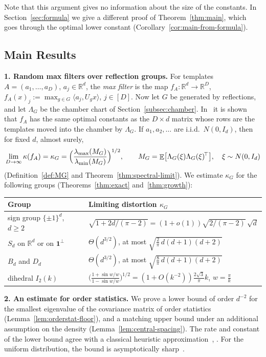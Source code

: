 \documentclass[11pt]{article}
\newcommand{\R}{\mathbb{R}}
\newcommand{\inner}[2]{\langle #1, #2 \rangle}
\theoremstyle{definition}
\DeclareMathOperator{\EX}{\mathbb{E}}
\begin{document}
	Note that this argument gives no information about the size of the constants. In
	Section~\ref{sec:formula} we give a different proof of Theorem~\ref{thm:main}, which
	goes through the optimal lower constant (Corollary~\ref{cor:main-from-formula}). 

	\subsection*{Main Results}

	\noindent\textbf{1. Random max filters over reflection groups.} For templates
	$A=(a_1,\dots,a_D)$, $a_j\in\R^d$, the \emph{max filter} \cite{cahill2025group} is the map $f_A\colon\R^d\to\R^D$,
	$f_A(x)_j:=\max_{g\in G}\inner{a_j}{U_gx}$, $j\in[D]$. Now let $G$ be generated by reflections, and let $\Lambda_G$ be the chamber chart of Section~\ref{subsec:chamber}. In~\cite[Lem.~9]{mixonpacker} it is shown that $f_A$ has the
	same optimal constants as the $D\times d$ matrix whose rows are the
	templates moved into the chamber by $\Lambda_G$. If $a_1,a_2,\dots$ are i.i.d.\
	$N(0,I_d)$, then for fixed $d$, almost surely,
	\[
	\lim_{D\to\infty}\kappa(f_A)=\kappa_G=\Bigl(\frac{\lambda_{\max}(M_G)}{\lambda_{\min}(M_G)}\Bigr)^{1/2},
	\qquad
	M_G=\EX\bigl[\Lambda_G(\xi)\Lambda_G(\xi)^{\!\top}\bigr],\quad \xi\sim N(0,I_d)
	\]
	(Definition~\ref{def:MG} and Theorem~\ref{thm:spectral-limit}). We  estimate $\kappa_G$ for the following groups
	(Theorems~\ref{thm:exact} and~\ref{thm:growth}):
	\begin{center}
		\renewcommand{\arraystretch}{1.3}
		\begin{tabular}{ll}
			\hline
			Group & Limiting distortion $\kappa_G$ \\
			\hline
			sign group $\{\pm1\}^d$, $d\ge2$ & $\sqrt{1+2d/(\pi-2)}=(1+o(1))\sqrt{2/(\pi-2)}\,\sqrt d$ \\
			$S_d$ on $\R^d$ or on $\mathbf 1^{\perp}$ & $\Theta(d^{3/2})$, at most $\sqrt{\tfrac2\pi\,d(d+1)(d+2)}$ \\
			$B_d$ and $D_d$ & $\Theta(d^{3/2})$, at most $\sqrt{\tfrac8\pi\,d(d+1)(d+2)}$ \\
			dihedral $I_2(k)$ & $\bigl(\tfrac{1+\sin w/w}{1-\sin w/w}\bigr)^{1/2}=(1+O(k^{-2}))\tfrac{2\sqrt3}{\pi}k$, $w=\tfrac\pi k$ \\
			\hline
		\end{tabular}
	\end{center}


	
	\smallskip
	\noindent\textbf{2. An estimate for order statistics.}
	We prove a lower bound of order $d^{-2}$ for the smallest
	eigenvalue of the covariance matrix of order statistics
	(Lemma~\ref{lem:orderstat-floor}), and a matching upper bound
	under an additional assumption on the density
	(Lemma~\ref{lem:central-spacing}).
	The rate and constant of the lower bound agree with a classical
	heuristic approximation~\cite{stephens1990asymptotic},
	\cite[Ch.~4]{david2003order}.
	For the uniform distribution, the bound is asymptotically
	sharp~\cite{durbin1972components}.
	
\end{document}
